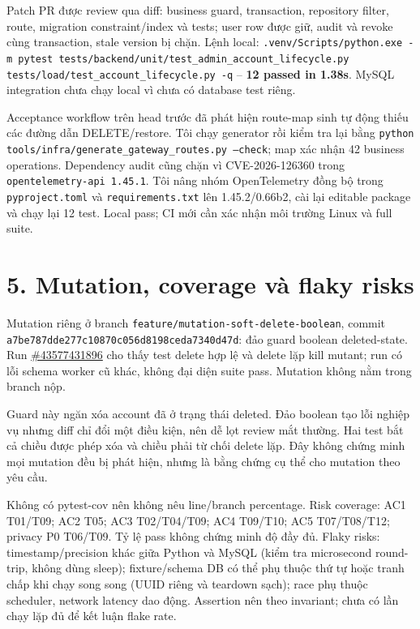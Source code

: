 \documentclass[10pt,a4paper]{article}
\begin{document}
Patch PR được review qua diff: business guard, transaction, repository filter, route, migration constraint/index và tests; user row được giữ, audit và revoke cùng transaction, stale version bị chặn. Lệnh local: \texttt{.venv/Scripts/python.exe -m pytest tests/backend/unit/test\_admin\_account\_lifecycle.py tests/load/test\_account\_lifecycle.py -q} -- \textbf{12 passed in 1.38s}. MySQL integration chưa chạy local vì chưa có database test riêng.

Acceptance workflow trên head trước đã phát hiện route-map sinh tự động thiếu các đường dẫn DELETE/restore. Tôi chạy generator rồi kiểm tra lại bằng \texttt{python tools/infra/generate\_gateway\_routes.py --check}; map xác nhận 42 business operations. Dependency audit cũng chặn vì CVE-2026-126360 trong \texttt{opentelemetry-api 1.45.1}. Tôi nâng nhóm OpenTelemetry đồng bộ trong \texttt{pyproject.toml} và \texttt{requirements.txt} lên 1.45.2/0.66b2, cài lại editable package và chạy lại 12 test. Local pass; CI mới cần xác nhận môi trường Linux và full suite.

\section*{5. Mutation, coverage và flaky risks}
Mutation riêng ở branch \texttt{feature/mutation-soft-delete-boolean}, commit \texttt{a7be787dde277c10870c056d8198ceda7340d47d}: đảo guard boolean deleted-state. Run \href{https://github.com/4PMs-3Workers/Production-Readiness-Lab/actions/runs/43577431896}{\#43577431896} cho thấy test delete hợp lệ và delete lặp kill mutant; run có lỗi schema worker cũ khác, không đại diện suite pass. Mutation không nằm trong branch nộp.

Guard này ngăn xóa account đã ở trạng thái deleted. Đảo boolean tạo lỗi nghiệp vụ nhưng diff chỉ đổi một điều kiện, nên dễ lọt review mắt thường. Hai test bắt cả chiều được phép xóa và chiều phải từ chối delete lặp. Đây không chứng minh mọi mutation đều bị phát hiện, nhưng là bằng chứng cụ thể cho mutation theo yêu cầu.

Không có pytest-cov nên không nêu line/branch percentage. Risk coverage: AC1 T01/T09; AC2 T05; AC3 T02/T04/T09; AC4 T09/T10; AC5 T07/T08/T12; privacy P0 T06/T09. Tỷ lệ pass không chứng minh độ đầy đủ. Flaky risks: timestamp/precision khác giữa Python và MySQL (kiểm tra microsecond round-trip, không dùng sleep); fixture/schema DB có thể phụ thuộc thứ tự hoặc tranh chấp khi chạy song song (UUID riêng và teardown sạch); race phụ thuộc scheduler, network latency dao động. Assertion nên theo invariant; chưa có lần chạy lặp đủ để kết luận flake rate.
\end{document}
